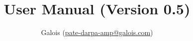 \documentclass{article}
\title{\TOOL{} User Manual (Version 0.5)}
\author{Galois (\href{mailto:pate-darpa-amp@galois.com}{pate-darpa-amp@galois.com})}
\begin{document}
\maketitle


\newpage
\tableofcontents

\acresetall





\end{document}
